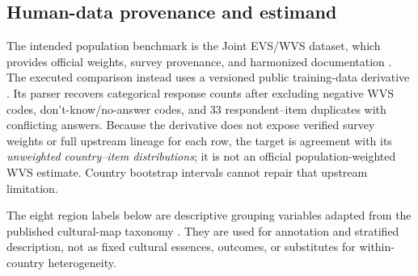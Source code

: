 \subsection{Human-data provenance and estimand}
The intended population benchmark is the Joint EVS/WVS dataset, which provides official
weights, survey provenance, and harmonized documentation \citep{evswvs2024joint}. The
executed comparison instead uses a versioned public training-data derivative
\citep{oxfordllmswvs}. Its parser recovers categorical response counts after excluding
negative WVS codes, don't-know/no-answer codes, and 33 respondent--item duplicates
with conflicting answers. Because the derivative does not expose verified survey weights
or full upstream lineage for each row, the target is agreement with its \emph{unweighted
country--item distributions}; it is not an official population-weighted WVS estimate.
Country bootstrap intervals cannot repair that upstream limitation.

The eight region labels below are descriptive grouping variables adapted from the
published cultural-map taxonomy \citep{wvs2023culturalmap}. They are used for annotation
and stratified description, not as fixed cultural essences, outcomes, or substitutes for
within-country heterogeneity.


\FloatBarrier
